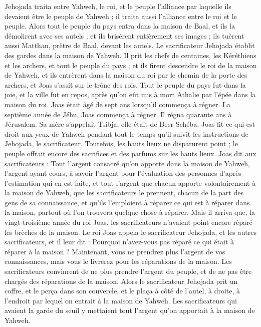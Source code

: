 \begin{multicols}{2}
Jehojada traita entre Yahweh, le roi, et le peuple l’alliance par laquelle ils devaient être le peuple de Yahweh ; il traita aussi l’alliance entre le roi et le peuple.
Alors tout le peuple du pays entra dans la maison de Baal, et ils la démolirent avec ses autels ; et ils brisèrent entièrement ses images ; ils tuèrent aussi Matthan, prêtre de Baal, devant les autels. Le sacrificateur Jehojada établit des gardes dans la maison de Yahweh.
Il prit les chefs de centaines, les Kéréthiens et les archers, et tout le peuple du pays ; et ils firent descendre le roi de la maison de Yahweh, et ils entrèrent dans la maison du roi par le chemin de la porte des archers, et Joas s’assit sur le trône des rois.
Tout le peuple du pays fut dans la joie, et la ville fut en repos, après qu’on eût mis à mort Athalie par l’épée dans la maison du roi.
Joas était âgé de sept ans lorsqu’il commença à régner.
\VerseOne{}La septième année de Jéhu, Joas commença à régner. Il régna quarante ans à Jérusalem. Sa mère s’appelait Tsibja, elle était de Beer-Schéba.
Joas fit ce qui est droit aux yeux de Yahweh pendant tout le temps qu’il suivit les instructions de Jehojada, le sacrificateur.
Toutefois, les hauts lieux ne disparurent point ; le peuple offrait encore des sacrifices et des parfums sur les hauts lieux.
Joas dit aux sacrificateurs : Tout l’argent consacré qu’on apporte dans la maison de Yahweh, l’argent ayant cours, à savoir l’argent pour l’évaluation des personnes d’après l’estimation qui en est faite, et tout l’argent que chacun apporte volontairement à la maison de Yahweh,
que les sacrificateurs le prennent, chacun de la part des gens de sa connaissance, et qu’ils l’emploient à réparer ce qui est à réparer dans la maison, partout où l’on trouvera quelque chose à réparer.
Mais il arriva que, la vingt-troisième année du roi Joas, les sacrificateurs n’avaient point encore réparé les brèches de la maison.
Le roi Joas appela le sacrificateur Jehojada, et les autres sacrificateurs, et il leur dit : Pourquoi n’avez-vous pas réparé ce qui était à réparer à la maison ? Maintenant, vous ne prendrez plus l’argent de vos connaissances, mais vous le livrerez pour les réparations de la maison.
Les sacrificateurs convinrent de ne plus prendre l’argent du peuple, et de ne pas être chargés des réparations de la maison.
Alors le sacrificateur Jehojada prit un coffre, et le perça dans son couvercle, et le plaça à côté de l’autel, à droite, à l’endroit par lequel on entrait à la maison de Yahweh. Les sacrificateurs qui avaient la garde du seuil y mettaient tout l’argent qu’on apportait à la maison de Yahweh.

\end{multicols}
